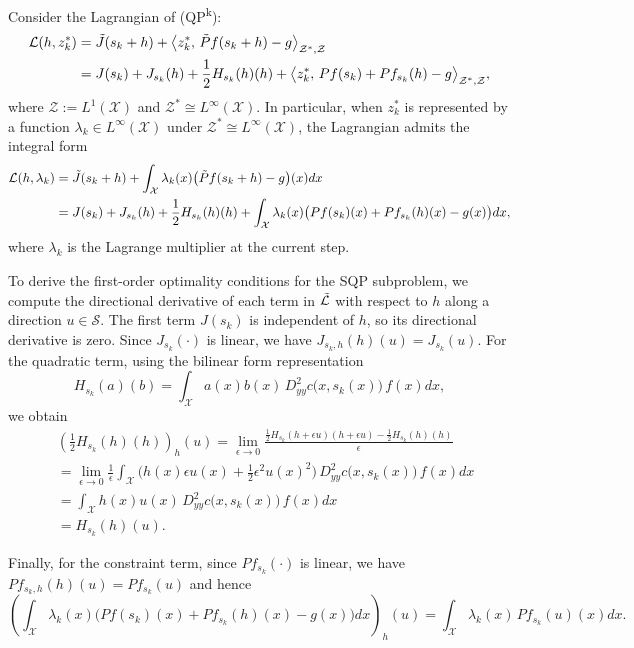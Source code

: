 \documentclass[12pt,leqno]{amsart}
\begin{document}
Consider the Lagrangian of (QP\textsuperscript{k}):
\begin{align*}
   \mathcal{L}(h, z_k^*)
   &= \Tilde{J}(s_k+ h) + \big\langle z_k^*,\,\Tilde{P}f(s_k+h)-g\big\rangle_{\mathcal{Z}^*,\mathcal{Z}}\\
   &=  J(s_k) + J_{s_k}(h)+ \frac{1}{2}H_{s_k}(h)(h)
    + \big\langle z_k^*,\,Pf(s_k) + Pf_{s_k}(h)-g\big\rangle_{\mathcal{Z}^*,\mathcal{Z}},
\end{align*}
where $\mathcal{Z}:=L^1(\mathcal{X})$ and $\mathcal{Z}^*\cong L^\infty(\mathcal{X})$. In particular, when $z_k^*$ is represented by a function $\lambda_k\in L^\infty(\mathcal{X})$ under $\mathcal{Z}^*\cong L^\infty(\mathcal{X})$, the Lagrangian admits the integral form
\begin{align*}
   \mathcal{L}(h, \lambda_k)
   &= \Tilde{J}(s_k+ h) + \int_{\mathcal{X}} \lambda_k(x)\big(\Tilde{P}f(s_k+h)-g\big)(x)dx\\
   &=  J(s_k) + J_{s_k}(h)+ \frac{1}{2}H_{s_k}(h)(h)
    + \int_{\mathcal{X}} \lambda_k(x)\big(Pf(s_k)(x) + Pf_{s_k}(h)(x)-g(x)\big)dx,
\end{align*}
where $\lambda_k$ is the Lagrange multiplier at the current step.

To derive the first-order optimality conditions for the SQP subproblem, we compute the directional derivative of each term in $\Tilde{\mathcal{L}}$ with respect to $h$ along a direction $u\in\mathcal{S}$. The first term $J(s_k)$ is independent of $h$, so its directional derivative is zero. Since $J_{s_k}(\cdot)$ is linear, we have $J_{s_k,h}(h)(u)=J_{s_k}(u)$. For the quadratic term, using the bilinear form representation
\[
H_{s_k}(a)(b)=\int_{\mathcal{X}} a(x)b(x)\,D^2_{yy}c\big(x,s_k(x)\big)\,f(x)dx,
\]
we obtain
\begin{align*}
    &\left(\frac{1}{2}H_{s_k}(h)(h)\right)_h(u)
    =\lim_{\epsilon\rightarrow 0}\frac{\frac{1}{2}H_{s_k}(h+\epsilon u)(h+\epsilon u)-\frac{1}{2}H_{s_k}(h)(h)}{\epsilon}\\
    &=\lim_{\epsilon\rightarrow 0}\frac{1}{\epsilon}\int_{\mathcal{X}}\Big(h(x)\epsilon u(x)+\tfrac{1}{2}\epsilon^2u(x)^2\Big)\,D^2_{yy}c\big(x,s_k(x)\big)\,f(x)dx\\
    &=\int_{\mathcal{X}} h(x)u(x)\,D^2_{yy}c\big(x,s_k(x)\big)\,f(x)dx\\
    &=H_{s_k}(h)(u).
\end{align*}

Finally, for the constraint term, since $Pf_{s_k}(\cdot)$ is linear, we have $Pf_{s_k,h}(h)(u)=Pf_{s_k}(u)$ and hence
\[
\left(\int_{\mathcal{X}} \lambda_k(x)\big(Pf(s_k)(x)+Pf_{s_k}(h)(x)-g(x)\big)dx\right)_h(u)
=\int_{\mathcal{X}} \lambda_k(x)\,Pf_{s_k}(u)(x)dx.
\]
\end{document}
